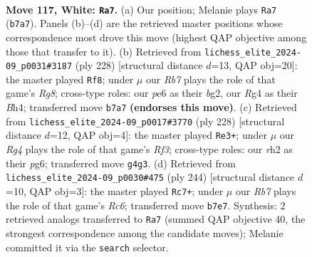 \documentclass[11pt]{article}
\begin{document}
\clearpage

\begin{figure}[p]\centering
\begin{subfigure}{0.46\textwidth}\centering
\resizebox{\linewidth}{!}{%
\newchessgame
\chessboard[
  setfen={2k5/1R6/4p3/4P3/5PR1/8/7r/5K2 w - - 19 117},
  showmover=false,
  pgfstyle=straightmove, color=movearrow, markmove={b7-a7}
]}
\caption{}
\end{subfigure}\hfill
\begin{subfigure}{0.46\textwidth}\centering
\resizebox{\linewidth}{!}{%
\newchessgame
\chessboard[
  setfen={6R1/7k/4r3/K1P4p/7B/6P1/6b1/8 w - - 45 115},
  showmover=false,
  pgfstyle=straightmove, color=movearrow, markmove={g8-f8}
]}
\caption{}
\end{subfigure}
\\[4pt]
\begin{subfigure}{0.46\textwidth}\centering
\resizebox{\linewidth}{!}{%
\newchessgame
\chessboard[
  setfen={8/r7/4k1p1/7p/7P/5RP1/8/6K1 w - - 66 115},
  showmover=false,
  pgfstyle=straightmove, color=movearrow, markmove={f3-e3}
]}
\caption{}
\end{subfigure}\hfill
\begin{subfigure}{0.46\textwidth}\centering
\resizebox{\linewidth}{!}{%
\newchessgame
\chessboard[
  setfen={8/6k1/2R5/7p/7P/6P1/6K1/1r6 w - - 91 123},
  showmover=false,
  pgfstyle=straightmove, color=movearrow, markmove={c6-c7}
]}
\caption{}
\end{subfigure}
\caption{\textbf{Move 117, White: \texttt{Ra7}.} (a) Our position; Melanie plays \texttt{Ra7} (\texttt{b7a7}). Panels (b)--(d) are the retrieved master positions whose correspondence most drove this move (highest QAP objective among those that transfer to it). (b) Retrieved from \texttt{lichess\_elite\_2024-09\_p0031\#3187} (ply 228) [structural distance $d$=13, QAP obj=20]: the master played \texttt{Rf8}; under $\mu$ our \emph{Rb7} plays the role of that game's \emph{Rg8}; cross-type roles: our \emph{p}e6 as their \emph{b}g2, our \emph{R}g4 as their \emph{B}h4; transferred move \texttt{b7a7} \textbf{(endorses this move)}. (c) Retrieved from \texttt{lichess\_elite\_2024-09\_p0017\#3770} (ply 228) [structural distance $d$=12, QAP obj=4]: the master played \texttt{Re3+}; under $\mu$ our \emph{Rg4} plays the role of that game's \emph{Rf3}; cross-type roles: our \emph{r}h2 as their \emph{p}g6; transferred move \texttt{g4g3}. (d) Retrieved from \texttt{lichess\_elite\_2024-09\_p0030\#475} (ply 244) [structural distance $d$=10, QAP obj=3]: the master played \texttt{Rc7+}; under $\mu$ our \emph{Rb7} plays the role of that game's \emph{Rc6}; transferred move \texttt{b7e7}. Synthesis: 2 retrieved analogs transferred to \texttt{Ra7} (summed QAP objective 40, the strongest correspondence among the candidate moves); Melanie committed it via the \texttt{search} selector.}
\label{fig:thought-m232}
\end{figure}
\end{document}
